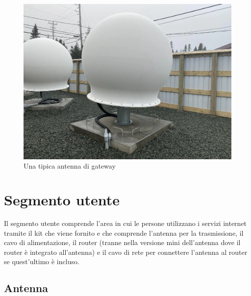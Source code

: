 \begin{figure}[htbp]
  \centering
  \includegraphics[width=0.9\linewidth]{./res/img/starlink_gateway_near.png}
  \caption{Una tipica antenna di gateway \cite{mike_puchol_modeling_2022}}
  \label{fig:starlink-gateway-near}
\end{figure}

\section{Segmento utente}
Il segmento utente comprende l'area in cui le persone utilizzano i servizi internet tramite il kit che viene fornito e che comprende l'antenna per la trasmissione, il cavo di alimentazione, il router (tranne nella versione mini dell'antenna dove il router è integrato all'antenna) e il cavo di rete per connettere l'antenna al router se quest'ultimo è incluso.\cite{branch_education_how_2022}

\subsection{Antenna}

